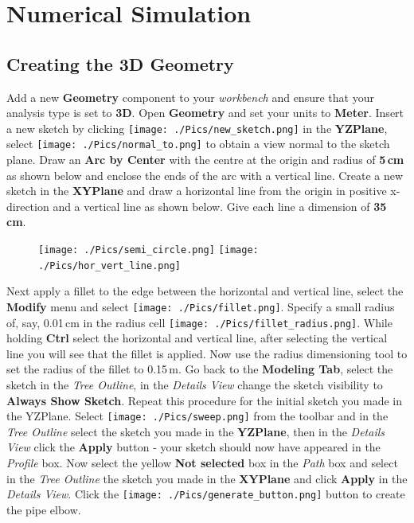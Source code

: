 \documentclass[12pts,a4paper,amsmath,amssymb,floatfix]{article}%
\newcommand\bfr[1]{\textcolor[rgb]{1,0.00,0.00}{\textbf{\textsf{#1}}}}
\begin{document}
\section{Numerical Simulation}

\subsection{Creating the 3D Geometry}
Add a new \bfr{Geometry} component to your \emph{workbench} and ensure that your analysis type is set to \bfr{3D}. Open \bfr{Geometry} and set your units to \bfr{Meter}. Insert a new sketch by clicking  \texttt{[image: ./Pics/new\_sketch.png]} in the \bfr{YZPlane}, select \texttt{[image: ./Pics/normal\_to.png]} to obtain a view normal to the sketch plane. Draw an \bfr{Arc by Center} with the centre at the origin and radius of \bfr{5\,cm} as shown below and enclose the ends of the arc with a vertical line. Create a new sketch in the \bfr{XYPlane} and draw a horizontal line from the origin in positive x-direction and a vertical line as shown below. Give each line a dimension of \bfr{35\,cm}.
\begin{figure}[H] 
\begin{center}
\texttt{[image: ./Pics/semi\_circle.png]}\quad
\texttt{[image: ./Pics/hor\_vert\_line.png]}
\end{center}
\end{figure}
Next apply a fillet to the edge between the horizontal and vertical line, select the \bfr{Modify} menu and select \texttt{[image: ./Pics/fillet.png]}.  Specify a small radius of, say, 0.01\,cm in the radius cell \texttt{[image: ./Pics/fillet\_radius.png]}. While holding \bfr{Ctrl} select the horizontal and vertical line, after selecting the vertical line you will see that the fillet is applied. Now use the radius dimensioning tool to set the radius of the fillet to 0.15\,m. Go back to the \bfr{Modeling Tab}, select the sketch in the \emph{Tree Outline}, in the \emph{Details View} change the sketch visibility to \bfr{Always Show Sketch}. Repeat this procedure for the initial sketch you made in the YZPlane. Select \texttt{[image: ./Pics/sweep.png]} from the toolbar and in the \emph{Tree Outline} select the sketch you made in the \bfr{YZPlane}, then in the \emph{Details View} click the \bfr{Apply} button - your sketch should now have appeared in the \emph{Profile} box. Now select the yellow \bfr{Not selected} box in the \emph{Path} box and select in the \emph{Tree Outline} the sketch you made in the \bfr{XYPlane} and click \bfr{Apply} in the \emph{Details View}. Click the \texttt{[image: ./Pics/generate\_button.png]} button to create the pipe elbow.
\end{document}
